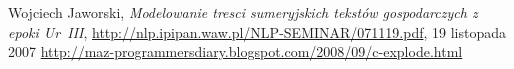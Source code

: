 \documentclass{pracamgr}
\begin{document}
\appendix



\begin{thebibliography}{99}
 Wojciech Jaworski, \textit{Modelowanie tresci sumeryjskich tekstów gospodarczych z epoki Ur~III}, 
\url{http://nlp.ipipan.waw.pl/NLP-SEMINAR/071119.pdf}, 19 listopada 2007
 \url{http://maz-programmersdiary.blogspot.com/2008/09/c-explode.html}




\end{thebibliography}

\listoffigures
\end{document}
